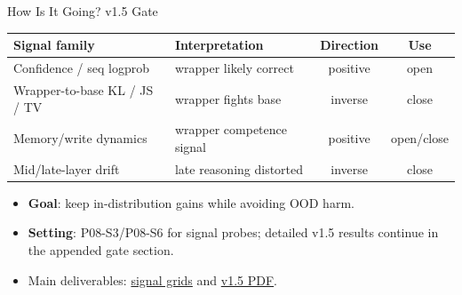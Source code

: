 \begin{frame}{How Is It Going? v1.5 Gate}
  \small
  \begin{table}
    \centering
    \begin{tabular}{llcc}
      \toprule
      Signal family & Interpretation & Direction & Use \\
      \midrule
      Confidence / seq logprob & wrapper likely correct & positive & open \\
      Wrapper-to-base KL / JS / TV & wrapper fights base & inverse & close \\
      Memory/write dynamics & wrapper competence signal & positive & open/close \\
      Mid/late-layer drift & late reasoning distorted & inverse & close \\
      \bottomrule
    \end{tabular}
  \end{table}
  \begin{itemize}
    \item \textbf{Goal}: keep in-distribution gains while avoiding OOD harm.
    \item \textbf{Setting}: P08-S3/P08-S6 for signal probes; detailed v1.5
      results continue in the appended gate section.
    \item Main deliverables:
      \href{https://github.com/BDeMo/research-notes/tree/main/notes/plans/08-model-outputs-delta-w/raw/grids-2026-06-04}{signal grids} and
      \href{https://github.com/BDeMo/research-notes/blob/main/notes/plans/08-model-outputs-delta-w/summary/2026-06-04/v1.5-intrinsic-gating-study-2026-06-04.pdf}{v1.5 PDF}.
  \end{itemize}
\end{frame}

